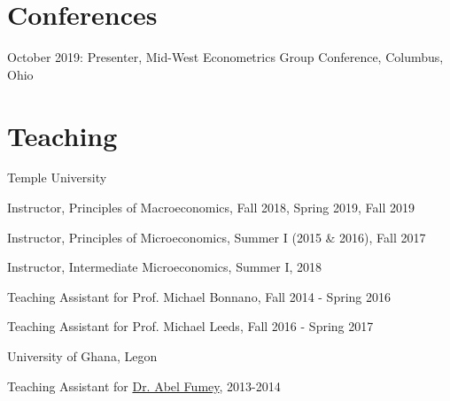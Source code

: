 \documentclass[12pt,letterpaper]{article}
\renewenvironment{itemize}{
  \begin{list}{}{
    \setlength{\leftmargin}{1.5em}
  }
}{
  \end{list}
}
\begin{document}
\section*{Conferences}
\begin{itemize}
	\item October 2019: Presenter, Mid-West Econometrics Group Conference, Columbus, Ohio
\end{itemize}

\section*{Teaching}
\begin{enumerate}
	\item Temple University
	\begin{itemize}
		\item Instructor, Principles of Macroeconomics, Fall 2018, Spring 2019, Fall 2019
		\item Instructor, Principles of Microeconomics, Summer I (2015 \& 2016), Fall 2017
		\item Instructor, Intermediate Microeconomics, Summer I, 2018
		\item Teaching Assistant for Prof. Michael Bonnano, Fall 2014 - Spring 2016
		\item Teaching Assistant for Prof. Michael Leeds, Fall 2016 - Spring 2017
	\end{itemize}
	\item University of Ghana, Legon
	\begin{itemize}
		\item Teaching Assistant for \href{https://www.ug.edu.gh/economics/staff/abel-fumey}{Dr. Abel Fumey}, 2013-2014
	\end{itemize}
\end{enumerate}
\end{document}
